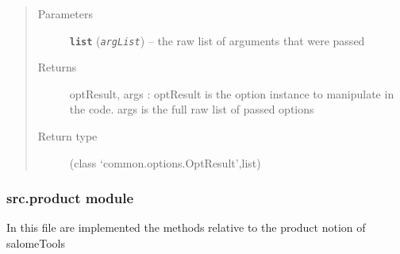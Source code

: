 \documentclass[a4paper,10pt,english]{sphinxmanual}
\begin{document}
\begin{fulllineitems}
\begin{fulllineitems}
\begin{description}
\end{description}
\begin{quote}\begin{description}
\item[{Parameters}] \leavevmode
\textbf{\texttt{list}} (\emph{\texttt{argList}}) -- the raw list of arguments that were passed

\item[{Returns}] \leavevmode
optResult, args : optResult is the option instance 
to manipulate in the code. args 
is the full raw list of passed options

\item[{Return type}] \leavevmode
(class `common.options.OptResult',list)

\end{description}\end{quote}

\end{fulllineitems}


\end{fulllineitems}



\subsubsection{src.product module}
\label{commands/apidoc/src:module-src.product}\label{commands/apidoc/src:src-product-module}
In this file are implemented the methods 
relative to the product notion of salomeTools
\end{document}

